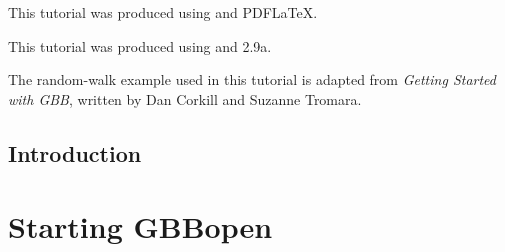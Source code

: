 \documentclass[10pt,twoside,english,pdftex]{article}
\begin{document}
\T\vspace{0.5in}
\W\bigskip

\W\begin{iftex}
This tutorial was produced using
 and PDF\LaTeX.
\W\end{iftex}

\T\begin{ifhtml}
This tutorial was produced using
and  2.9a.
\T\end{ifhtml}

\T\cleardoublepage
\W{}
\T\bgroup
\T\parskip 0pt
\tableofcontents
\T\egroup


\T\clearpage
\W{}

\W\setcounter{htmlautomenu}{1}



The random-walk example used in this tutorial is adapted from \textit{Getting
  Started with GBB\/}, written by Dan Corkill and Suzanne Tromara.


\W\begin{iftex}
  \markright{}%
  \cleardoublepage
  \setcounter{page}{1}
  \pagestyle{fancy}
  \thispagestyle{fancybottom}
  \section*{Introduction}
  \label{sec:introduction}%
  
\W\end{iftex}


\T\markright{}%
\T\pagestyle{plain}
\T\cleardoublepage
\W{}
\T\pagestyle{fancy}
\T\thispagestyle{fancybottom}
\T\renewcommand{\headrulewidth}{0pt}
\section{Starting GBBopen}
\label{sec:starting-up}%
\end{document}
